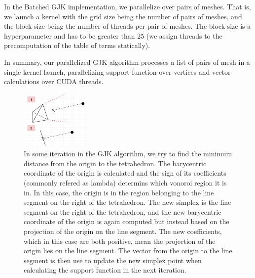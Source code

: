 \documentclass[12pt,fleqn]{article}
\begin{document}
In the Batched GJK implementation, we parallelize over pairs of meshes. That is, we launch a kernel with the grid size being the number of pairs of meshes, and the block size being the number of threads per pair of meshes. The block size is a hyperparameter and has to be greater than 25 (we assign threads to the precomputation of the table of terms statically).

In summary, our parallelized GJK algorithm processes a list of pairs of mesh in a single kernel launch, parallelizing support function over vertices and vector calculations over CUDA threads.

\begin{figure}[ht!]
    \centering
    \includegraphics[width=0.3\textwidth]{figs/reduction.png}
    \caption{%
    In some iteration in the GJK algorithm, we try to find the minimum distance from the origin to the tetrahedron. The barycentric coordinate of the origin is calculated and the sign of its coefficients (commonly refered as lambda) determins which vonoroi region it is in. In this case, the origin is in the region belonging to the line segment on the right of the tetrahedron. The new simplex is the line segment on the right of the tetrahedron, and the new barycentric coordinate of the origin is again computed but instead based on the projection of the origin on the line segment. The new coefficients, which in this case are both positive, mean the projection of the origin lies on the line segment. The vector from the origin to the line segment is then use to update the new simplex point when calculating the support function in the next iteration.}
    \label{fig:reduction}
\end{figure}
\end{document}
